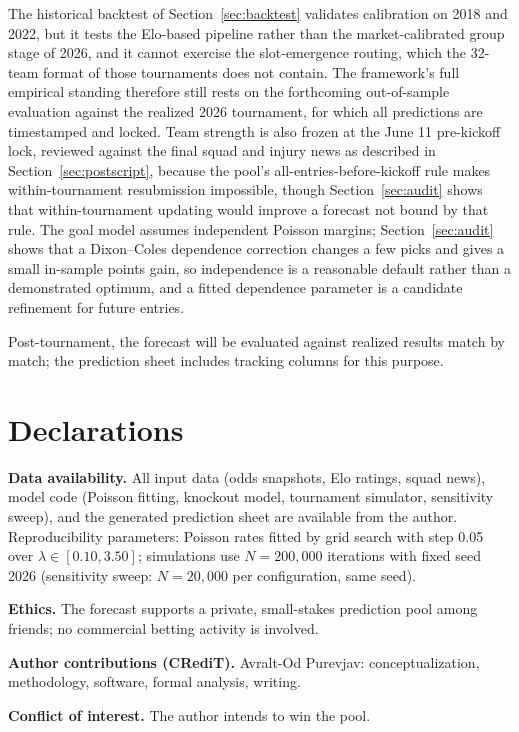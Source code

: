 \documentclass[11pt,a4paper]{article}
\begin{document}
The historical backtest of Section~\ref{sec:backtest} validates calibration on 2018 and 2022, but it tests the Elo-based pipeline rather than the market-calibrated group stage of 2026, and it cannot exercise the slot-emergence routing, which the 32-team format of those tournaments does not contain. The framework's full empirical standing therefore still rests on the forthcoming out-of-sample evaluation against the realized 2026 tournament, for which all predictions are timestamped and locked. Team strength is also frozen at the June 11 pre-kickoff lock, reviewed against the final squad and injury news as described in Section~\ref{sec:postscript}, because the pool's all-entries-before-kickoff rule makes within-tournament resubmission impossible, though Section~\ref{sec:audit} shows that within-tournament updating would improve a forecast not bound by that rule. The goal model assumes independent Poisson margins; Section~\ref{sec:audit} shows that a Dixon--Coles dependence correction changes a few picks and gives a small in-sample points gain, so independence is a reasonable default rather than a demonstrated optimum, and a fitted dependence parameter is a candidate refinement for future entries.

Post-tournament, the forecast will be evaluated against realized results match by match; the prediction sheet includes tracking columns for this purpose.

\section*{Declarations}

\noindent\textbf{Data availability.} All input data (odds snapshots, Elo ratings, squad news), model code (Poisson fitting, knockout model, tournament simulator, sensitivity sweep), and the generated prediction sheet are available from the author. Reproducibility parameters: Poisson rates fitted by grid search with step 0.05 over $\lambda \in [0.10, 3.50]$; simulations use $N = 200{,}000$ iterations with fixed seed 2026 (sensitivity sweep: $N = 20{,}000$ per configuration, same seed).

\noindent\textbf{Ethics.} The forecast supports a private, small-stakes prediction pool among friends; no commercial betting activity is involved.

\noindent\textbf{Author contributions (CRediT).} Avralt-Od Purevjav: conceptualization, methodology, software, formal analysis, writing.

\noindent\textbf{Conflict of interest.} The author intends to win the pool.
\end{document}
